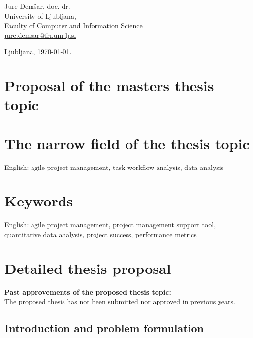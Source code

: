 \documentclass[a4paper, 12pt]{article}
\begin{document}
\hfill\begin{minipage}{\dimexpr\textwidth-2cm}
Jure Demšar, doc. dr. \\
University of Ljubljana, \\
Faculty of Computer and Information Science\\
\href{mailto:jure.demsar@fri.uni-lj.si}{jure.demsar@fri.uni-lj.si}
\end{minipage}

\bigskip

\hfill Ljubljana, \today.


\clearpage
\section*{Proposal of the masters thesis topic}

\section{The narrow field of the thesis topic}

English: agile project management, task workflow analysis, data analysis


\section{Keywords}

English: agile project management, project management support tool, quantitative data analysis, project success, performance metrics


\section{Detailed thesis proposal}


\textbf{Past approvements of the proposed thesis topic:}\\
The proposed thesis has not been submitted nor approved in previous years.

\subsection{Introduction and problem formulation}
\end{document}
